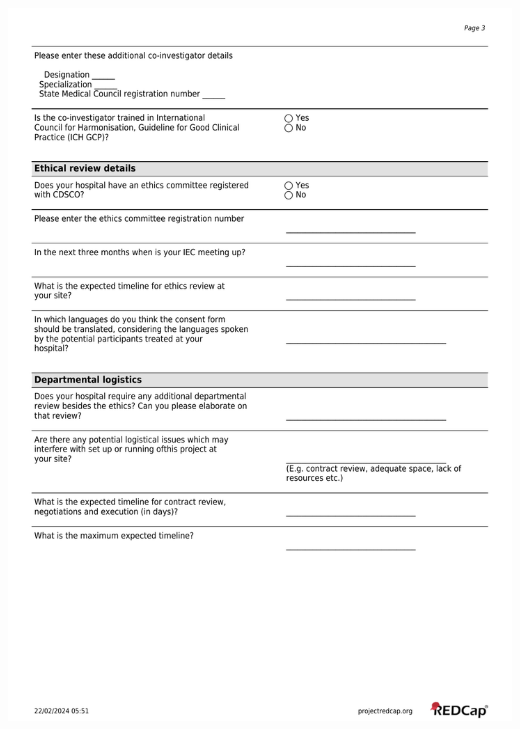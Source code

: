 \documentclass[
]{scrartcl}
\begin{document}
\includegraphics{./appendices/hospital-screening-interview-instrument/hospital-screening-interview-3.pdf}
\end{document}
